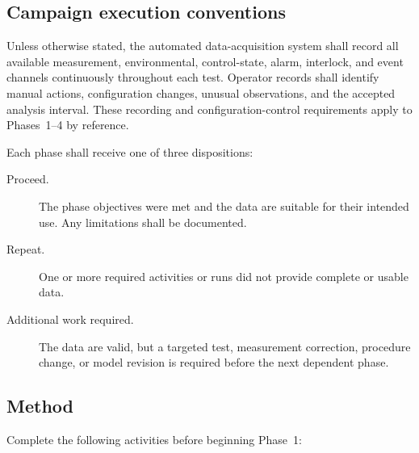 \documentclass[11pt]{article}
\begin{document}
\subsection{Campaign execution conventions}
Unless otherwise stated, the automated data-acquisition system shall record all available measurement, environmental, control-state, alarm, interlock, and event channels continuously throughout each test. Operator records shall identify manual actions, configuration changes, unusual observations, and the accepted analysis interval. These recording and configuration-control requirements apply to Phases~1--4 by reference.

Each phase shall receive one of three dispositions:
\begin{description}
    \item[Proceed.] The phase objectives were met and the data are suitable for their intended use. Any limitations shall be documented.
    \item[Repeat.] One or more required activities or runs did not provide complete or usable data.
    \item[Additional work required.] The data are valid, but a targeted test, measurement correction, procedure change, or model revision is required before the next dependent phase.
\end{description}

\subsection{Method}

Complete the following activities before beginning Phase~1:
\end{document}
